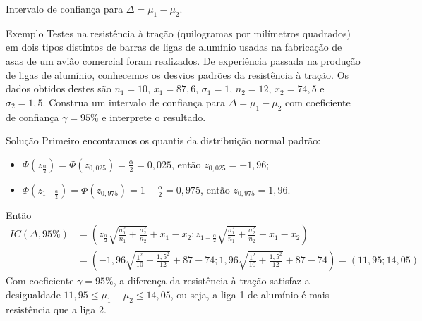 \documentclass[9pt]{beamer}
\begin{document}
\begin{frame}{Intervalo de confiança para $\Delta = \mu_1-\mu_2$.}

\footnotesize

\begin{block}{Exemplo}
	Testes na resistência à tração (quilogramas por milímetros quadrados) em dois tipos distintos de barras de ligas de alumínio usadas na fabricação de asas de um avião comercial foram realizados. De experiência passada na produção de ligas de alumínio, conhecemos os desvios padrões da resistência à tração. Os dados obtidos destes são $n_1=10$, $\bar{x}_1=87,6$, $\sigma_1=1$, $n_2=12$, $\bar{x}_2=74,5$ e $\sigma_2=1,5$. Construa um intervalo de confiança para $\Delta=\mu_1-\mu_2$ com coeficiente de confiança $\gamma=95\%$ e interprete o resultado.
\end{block}

\begin{block}{Solução}
	Primeiro encontramos os quantis da distribuição normal padrão:
	\begin{itemize}
		\item $\Phi\left(z_{\frac{\alpha}{2}}\right) = \Phi\left(z_{0,025}\right) = \frac{\alpha}{2} = 0,025$, então $z_{0,025} = -1,96$;
		\item $\Phi\left(z_{1-\frac{\alpha}{2}}\right) = \Phi\left(z_{0,975}\right) =1- \frac{\alpha}{2} = 0,975$, então $z_{0,975} = 1,96$.
	\end{itemize}
	Então
	\begin{align*}
		IC(\Delta, 95\%) &= \left( z_{\frac{\alpha}{2}} \sqrt{ \frac{\sigma_1^2}{n_1} + \frac{\sigma_2^2}{n_2}}  + \bar{x}_1 - \bar{x}_2; z_{1-\frac{\alpha}{2}} \sqrt{ \frac{\sigma_1^2}{n_1} + \frac{\sigma_2^2}{n_2}}  + \bar{x}_1 - \bar{x}_2  \right)\\
		&= \left( -1,96 \sqrt{ \frac{1^2}{10} + \frac{1,5^2}{12}} + 87 - 74; 1,96 \sqrt{ \frac{1^2}{10} + \frac{1,5^2}{12}} + 87 - 74 \right)= \left(11,95; 14,05\right)
	\end{align*}
	Com coeficiente $\gamma=95\%$, a diferença da resistência à tração satisfaz a desigualdade $11,95 \leq \mu_1 - \mu_2 \leq 14,05$, ou seja, a liga 1 de alumínio é mais resistência que a liga 2.
\end{block}

\normalsize
\end{frame}
\end{document}
